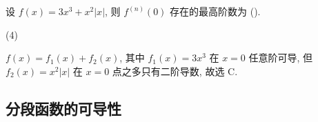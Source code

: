\begin{example}[1992 数一]
    设 $f(x)=3x^{3}+x^2|x|$, 则 $f^{(n)}(0)$ 存在的最高阶数为 (\quad).
    \begin{tasks}(4)
    \end{tasks}
\end{example}
\begin{solution}
    $f(x)=f_1(x)+f_2(x)$, 其中 $f_1(x)=3x^3$ 在 $x=0$ 任意阶可导, 但 $f_2(x)=x^2|x|$ 在 $x=0$ 点之多只有二阶导数, 故选 C.
\end{solution}

\subsection{分段函数的可导性}

% 

